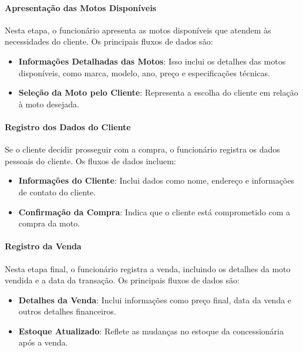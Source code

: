 \paragraph{Apresentação das Motos Disponíveis}

Nesta etapa, o funcionário apresenta as motos disponíveis que atendem às necessidades do cliente. Os principais fluxos de dados são:

\begin{itemize}
	\item \textbf{Informações Detalhadas das Motos}: Isso inclui os detalhes das motos disponíveis, como marca, modelo, ano, preço e especificações técnicas.
	\item \textbf{Seleção da Moto pelo Cliente}: Representa a escolha do cliente em relação à moto desejada.
\end{itemize}

\paragraph{Registro dos Dados do Cliente}

Se o cliente decidir prosseguir com a compra, o funcionário registra os dados pessoais do cliente. Os fluxos de dados incluem:

\begin{itemize}
	\item \textbf{Informações do Cliente}: Inclui dados como nome, endereço e informações de contato do cliente.
	\item \textbf{Confirmação da Compra}: Indica que o cliente está comprometido com a compra da moto.
\end{itemize}

\paragraph{Registro da Venda}

Nesta etapa final, o funcionário registra a venda, incluindo os detalhes da moto vendida e a data da transação. Os principais fluxos de dados são:

\begin{itemize}
	\item \textbf{Detalhes da Venda}: Inclui informações como preço final, data da venda e outros detalhes financeiros.
	\item \textbf{Estoque Atualizado}: Reflete as mudanças no estoque da concessionária após a venda.
\end{itemize}


